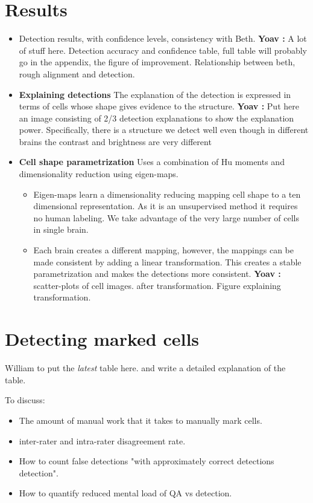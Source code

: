 \documentclass[runningheads]{llncs}
\newcommand{\comment}[3]{{\color{#1} {\bf #2 :} #3}}
\newcommand{\yoav}[1]{\comment{purple}{Yoav}{#1}}
\begin{document}
\section{Results}

\begin{itemize}
    \item Detection results, with confidence levels, consistency with Beth.
    \yoav{A lot of stuff here. Detection accuracy and confidence table, full table will probably go in the appendix, the figure of improvement. Relationship between beth, rough alignment and detection.}
    \item {\bf Explaining detections} The explanation of the detection is expressed in terms of cells whose shape gives evidence to the structure.
    \yoav{Put here an image consisting of 2/3 detection explanations to show the explanation power. Specifically, there is a structure we detect well even though in different brains the contrast and brightness are very different}
\item {\bf Cell shape parametrization} Uses a combination of Hu moments and dimensionality reduction using eigen-maps.
\begin{itemize}
    \item Eigen-maps learn a dimensionality reducing mapping cell shape to a ten dimensional representation.
    As it is an unsupervised method it requires no human labeling. We take advantage of the very large number of cells in single brain. 
    \item Each brain creates a different mapping, however, the mappings can be made consistent by adding a linear transformation. This creates a stable parametrization and makes the detections more consistent.\yoav{scatter-plots of cell images. after transformation. Figure explaining transformation.}
\end{itemize}

\end{itemize}

\section{Detecting marked cells}

William to put the {\em latest} table here. and write a detailed
explanation of the table.

To discuss:
\begin{itemize}
\item The amount of manual work that it takes to manually mark cells.
\item inter-rater and intra-rater disagreement rate.
\item How to count false detections "with approximately correct
  detections detection".
\item How to quantify reduced mental load of QA vs detection.
\end{itemize}
\end{document}
